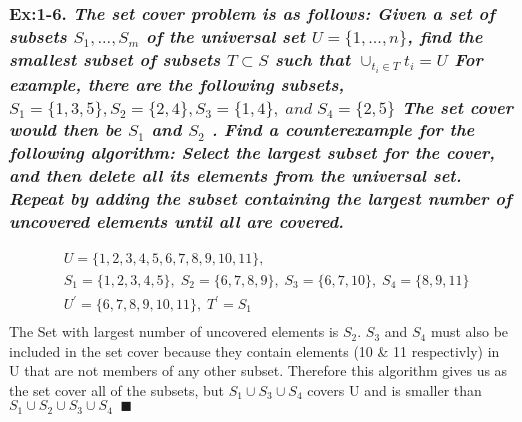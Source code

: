 \subsubsection*{\textbf{\enspace Ex:1-6.} \emph{\textbf{The set cover problem is as follows: } Given a set of subsets $S_{1}, ..., S_{m}$ of the universal set 
$U = \{1, ..., n\}$, 
find the smallest subset of subsets 
$T \subset S$ 
such that  
$\cup_{t_{i} \in T}t_{i} = U$ For example, there are the following subsets, $S_{1} = \{1, 3, 5\}, S_{2} = \{2, 4\}, S_{3} = \{1, 4\}, \; and \; S_{4} = \{2, 5\}$ The set cover would then be $S_{1}$ and $S_{2}$ . } 
\emph{\textbf{Find a counterexample for the following algorithm:} Select the largest subset for the cover, and then delete all its elements from the universal set. Repeat by adding the subset containing the largest number of uncovered elements until all are covered.}}
{\color{answer}{}
\begin{align*}
	&U = \{1,2,3,4,5,6,7,8,9,10,11\}, \\
	&S_{1} = \{1,2,3,4,5\}, \; S_{2} = \{6,7,8,9\}, \; S_{3} = \{6,7,10\}, \; S_{4} = \{8,9,11\} \\
	&U^{'} = \{6,7,8,9,10,11\}, \; T^{'} = S_{1} \\
\end{align*}
The Set with largest number of uncovered elements is $S_{2}$. $S_{3}$ and $S_{4}$ must also be included in the set cover because they contain elements (10 \& 11 respectivly)
in U that are not members of any other subset. Therefore this algorithm gives us as the set cover all of the subsets, but $S_{1} \cup S_{3} \cup S_{4}$ covers U and is smaller
than $S_{1} \cup S_{2} \cup S_{3} \cup S_{4}\;\;\blacksquare$ 
}
